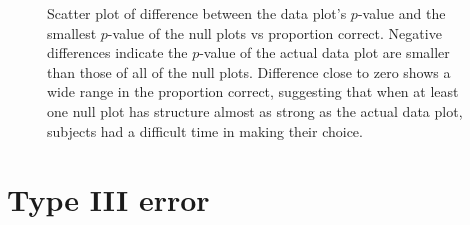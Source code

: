 \documentclass[12pt]{article}
\begin{document}
\begin{figure}[hbtp]
   \centering
       \caption{Scatter plot of difference between the data plot's $p$-value and the  smallest $p$-value of the null plots vs proportion correct. Negative differences indicate the $p$-value of the actual data plot are smaller than those of all of the null plots. Difference close to zero shows a wide range in the proportion correct, suggesting that when at least one null plot has structure almost as strong as the actual data plot, subjects had a difficult time in making their choice.}
       \label{fig:pval_difference}
\end{figure}

\section{Type III error}~\label{sec:TypeIII}\label{sec:typeIII_error}


\end{document}
